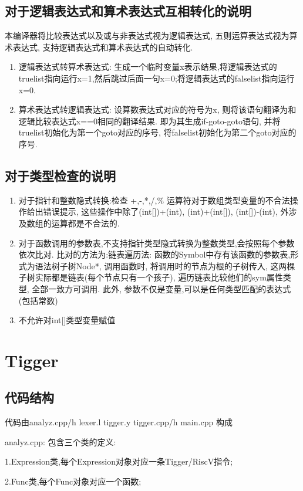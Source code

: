 \documentclass[UTF8]{article}
\begin{document}
\subsection{对于逻辑表达式和算术表达式互相转化的说明}
本编译器将比较表达式以及或与非表达式视为逻辑表达式, 五则运算表达式视为算术表达式, 支持逻辑表达式和算术表达式的自动转化.

\begin{enumerate}[(1)]
\item 逻辑表达式转算术表达式: 生成一个临时变量x表示结果,将逻辑表达式的truelist指向运行x=1,然后跳过后面一句x=0;将逻辑表达式的falselist指向运行x=0.
\item 算术表达式转逻辑表达式: 设算数表达式对应的符号为x, 则将该语句翻译为和逻辑比较表达式x==0相同的翻译结果. 即为其生成if-goto-goto语句, 并将truelist初始化为第一个goto对应的序号, 将falselist初始化为第二个goto对应的序号.
\end{enumerate}
\subsection{对于类型检查的说明}
\begin{enumerate}
\item 对于指针和整数隐式转换:检查 +,-,*,/,\% 运算符对于数组类型变量的不合法操作给出错误提示, 这些操作中除了(int[])+(int), (int)+(int[]), (int[])-(int), 外涉及数组的运算都是不合法的.
\item 对于函数调用的参数表,不支持指针类型隐式转换为整数类型,会按照每个参数依次比对. 比对的方法为:链表遍历法: 函数的Symbol中存有该函数的参数表,形式为语法树子树Node*, 调用函数时, 将调用时的节点为根的子树传入, 这两棵子树实际都是链表(每个节点只有一个孩子), 遍历链表比较他们的sym属性类型, 全部一致方可调用. 此外, 参数不仅是变量,可以是任何类型匹配的表达式(包括常数)
\item 不允许对int[]类型变量赋值
\end{enumerate}
\section{Tigger}
\subsection{代码结构}
代码由analyz.cpp/h lexer.l tigger.y tigger.cpp/h main.cpp 构成

analyz.cpp: 包含三个类的定义: 

	1.Expression类,每个Expression对象对应一条Tigger/RiscV指令;
	
	2.Func类,每个Func对象对应一个函数; 
	
\end{document}

